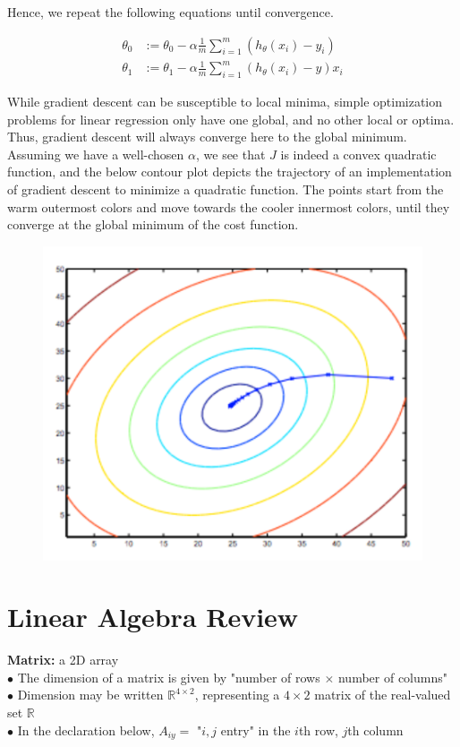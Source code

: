 \documentclass{article}
\begin{document}
        \noindent Hence, we repeat the following equations until convergence.

        \begin{align*}
            \theta_0 &:= \theta_0-\alpha\frac{1}{m}\sum^m_{i=1}(h_\theta(x_i)-y_i) \\
            \theta_1 &:= \theta_1-\alpha\frac{1}{m}\sum^m_{i=1}(h_\theta(x_i)-y)x_i
        \end{align*}

        \noindent While gradient descent can be susceptible to local minima, simple optimization problems for
        linear regression only have one global, and no other local or optima. Thus, gradient descent will always
        converge here to the global minimum. Assuming we have a well-chosen $\alpha$, we see that $J$ is indeed
        a convex quadratic function, and the below contour plot depicts the trajectory of an implementation of
        gradient descent to minimize a quadratic function. The points start from the warm outermost colors and
        move towards the cooler innermost colors, until they converge at the global minimum of the cost function.

        \begin{figure}[hbt!]
            \centering
            \includegraphics[scale=0.75]{Resources/Contour2}
        \end{figure}



    \pagebreak
    \section{Linear Algebra Review}
        \textbf{Matrix:} a 2D array \\
        $\bullet$ The dimension of a matrix is given by "number of rows $\times$ number of columns" \\
        $\bullet$ Dimension may be written $\mathbb{R}^{4\times 2}$, representing a $4\times2$ matrix of the
        real-valued set $\mathbb{R}$ \\
        $\bullet$ In the declaration below, $A_{iy}=$ "$i,j$ entry" in the $i$th row, $j$th column
\end{document}
